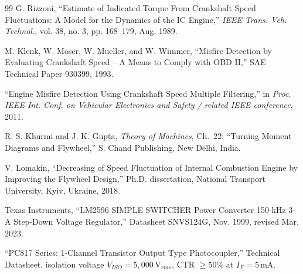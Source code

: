 \documentclass[journal, twocolumn]{IEEEtran}
\begin{document}
\begin{thebibliography}{99}
G. Rizzoni, ``Estimate of Indicated Torque From Crankshaft Speed Fluctuations: A Model for the Dynamics of the IC Engine,'' \emph{IEEE Trans. Veh. Technol.}, vol. 38, no. 3, pp. 168--179, Aug. 1989.

M. Klenk, W. Moser, W. Mueller, and W. Wimmer, ``Misfire Detection by Evaluating Crankshaft Speed -- A Means to Comply with OBD II,'' SAE Technical Paper 930399, 1993.

``Engine Misfire Detection Using Crankshaft Speed Multiple Filtering,'' in \emph{Proc. IEEE Int. Conf. on Vehicular Electronics and Safety / related IEEE conference}, 2011.

R. S. Khurmi and J. K. Gupta, \emph{Theory of Machines}, Ch.\ 22: ``Turning Moment Diagrams and Flywheel,'' S. Chand Publishing, New Delhi, India.

V. Lomakin, ``Decreasing of Speed Fluctuation of Internal Combustion Engine by Improving the Flywheel Design,'' Ph.D. dissertation, National Transport University, Kyiv, Ukraine, 2018.

Texas Instruments, ``LM2596 SIMPLE SWITCHER Power Converter 150-kHz 3-A Step-Down Voltage Regulator,'' Datasheet SNVS124G, Nov. 1999, revised Mar. 2023.

``PC817 Series: 1-Channel Transistor Output Type Photocoupler,'' Technical Datasheet, isolation voltage $V_{ISO}=5{,}000\,\text{V}_{rms}$, CTR $\geq 50\%$ at $I_F=5\,\text{mA}$.

\end{thebibliography}
\end{document}
